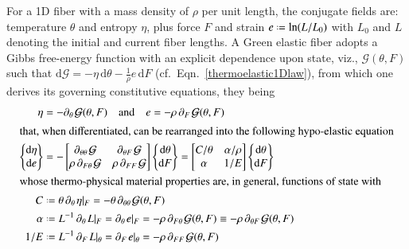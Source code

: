 For a 1D fiber with a mass density of $\rho$ per unit length, the conjugate fields are: temperature $\theta$ and entropy $\eta$, plus force $F$ and strain $e \defeq \ln (L/L_0)$ with $L_0$ and $L$ denoting the initial and current fiber lengths.  A Green elastic fiber adopts a Gibbs free-energy function with an explicit dependence upon state, viz., $\mathcal{G} (\theta , F)$ such that $\mathrm{d} \mathcal{G} = -\eta \, \mathrm{d} \theta - \tfrac{1}{\rho} e \, \mathrm{d}F$ (cf.~Eqn.~\ref{thermoelastic1Dlaw}), from which one derives its governing constitutive equations, they being
\begin{subequations}
    \label{fiberConstitutiveTheory}
    \begin{align}
\eta & = -\partial_{\theta\,} \mathcal{G} (\theta , F)
\quad \text{and} \quad
e = -\rho \, \partial_{F\,} \mathcal{G} (\theta, F)
\label{entropyStrain1D} \\
\intertext{that, when differentiated, can be rearranged into the following hypo-elastic equation}
\left\{ \begin{matrix}
\mathrm{d} \eta \\ \mathrm{d} e 
\end{matrix} \right\} & = -\begin{bmatrix}
\partial_{\theta\theta\,} \mathcal{G} & \partial_{\theta F\,} \mathcal{G} \\
\rho \, \partial_{F\theta\,} \mathcal{G} & \rho \, \partial_{FF\,} \mathcal{G}
\end{bmatrix} 
\left\{ \begin{matrix}
\mathrm{d} \theta \\ \mathrm{d} F
\end{matrix} \right\}
= \begin{bmatrix}
C / \theta & \alpha / \rho \\
\alpha & 1 / E
\end{bmatrix}
\left\{ \begin{matrix}
\mathrm{d} \theta \\ \mathrm{d} F
\end{matrix} \right\}
\label{thermoelasticCE1D} \\
    \intertext{whose thermo-physical material properties are, in general, functions of state with}
    C & \defeq \theta \, \partial_{\theta\,} \eta |_F = 
    -\theta \, \partial_{\theta\theta\,} \mathcal{G} (\theta , F)
    \label{specificHeat} \\
    \alpha & \defeq L^{-1} \, \partial_{\theta\,} L |_F = \partial_{\theta\,} e |_F =
    -\rho \, \partial_{F\theta\,} \mathcal{G} (\theta , F) \equiv
    -\rho \, \partial_{\theta F\,} \mathcal{G} (\theta , F)
    \label{thermalExpansion} \\
    1 / E & \defeq L^{-1} \, \partial_{F\,} L |_{\theta} = \partial_{F\,} e |_{\theta} =
    -\rho \, \partial_{FF\,} \mathcal{G} (\theta , F)
    \label{compliance}
    \end{align}
\end{subequations}
